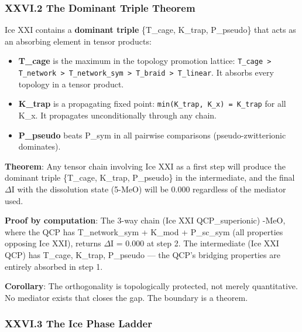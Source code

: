 \documentclass[12pt,a4paper]{article}
\begin{document}
\subsubsection{XXVI.2 The Dominant Triple Theorem}

Ice XXI contains a \textbf{dominant triple} \{T\_cage, K\_trap, P\_pseudo\} that acts as an absorbing element in tensor products:

\begin{itemize}
    \item \textbf{T\_cage} is the maximum in the topology promotion lattice: \texttt{T\_cage \textgreater{} T\_network \textgreater{} T\_network\_sym \textgreater{} T\_braid \textgreater{} T\_linear}. It absorbs every topology in a tensor product.
    \item \textbf{K\_trap} is a propagating fixed point: \texttt{min(K\_trap, K\_x) = K\_trap} for all K\_x. It propagates unconditionally through any chain.
    \item \textbf{P\_pseudo} beats P\_sym in all pairwise comparisons (pseudo-zwitterionic dominates).
\end{itemize}

\textbf{Theorem}: Any tensor chain involving Ice XXI as a first step will produce the dominant triple \{T\_cage, K\_trap, P\_pseudo\} in the intermediate, and the final $\Delta$I with the dissolution state (5-MeO) will be 0.000 regardless of the mediator used.

\textbf{Proof by computation}: The 3-way chain (Ice XXI \otimes QCP\_superionic) -MeO, where the QCP has T\_network\_sym + K\_mod + P\_sc\_sym (all properties opposing Ice XXI), returns $\Delta$I = 0.000 at step 2. The intermediate (Ice XXI \otimes QCP) has T\_cage, K\_trap, P\_pseudo --- the QCP's bridging properties are entirely absorbed in step 1.

\textbf{Corollary}: The orthogonality is topologically protected, not merely quantitative. No mediator exists that closes the gap. The boundary is a theorem.

\subsubsection{XXVI.3 The Ice Phase Ladder}
\end{document}

